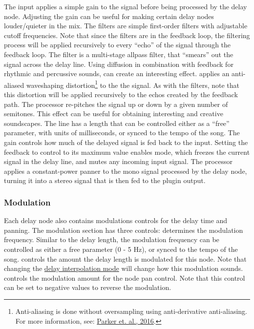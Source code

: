 \documentclass[landscape,twocolumn,a5paper]{manual}
\begin{document}
%
The input  applies a simple gain
to the signal before being processed by the delay
node. Adjusting the gain can be useful for making
certain delay nodes louder/quieter in the mix.
\newline
The  filters are simple
first-order filters with adjustable cutoff frequencies.
Note that since the filters are in the feedback loop,
the filtering process will be applied recursively to every
``echo'' of the signal through the feedback loop.
\newpar
The  filter is a multi-stage allpass
filter, that ``smears'' out the signal across the delay line.
Using diffusion in combination with feedback for rhythmic
and percussive sounds, can create an interesting effect.
\newpar
{} applies an anti-aliased waveshaping
distortion\footnote{Anti-aliasing is done without oversampling using anti-derivative anti-aliasing. For more information, see: \href{http://dafx16.vutbr.cz/dafxpapers/20-DAFx-16_paper_41-PN.pdf}{Parker et. al., 2016}.}
to the the signal. As with the filters, note that this
distortion will be applied recursively to the echos created
by the feedback path.
\newpar
The  processor re-pitches the signal up
or down by a given number of semitones. This effect can be
useful for obtaining interesting and creative soundscapes.
\newline
The  line has a length that can be
controlled either as a ``free'' parameter, with units
of milliseconds, or synced to the tempo of the song.
\newpar
The  gain controls how much of the
delayed signal is fed back to the input.
Setting the feedback to control to its maximum value
enables  mode, which freezes the
current signal in the delay line, and mutes any incoming
input signal.
\newpar
The  processor applies a constant-power
panner to the mono signal processed by the delay node,
turning it into a stereo signal that is then fed to the
plugin output.

\subsubsection{Modulation}
Each delay node also contains modulations controls for the
delay time and panning. The modulation section has three
controls:
\newpar
{} determines the modulation frequency.
Similar to the delay length, the modulation frequency can
be controlled as either a free parameter (0 - 5 Hz), or
synced to the tempo of the song.
\newpar
{} controls the amount the delay length
is modulated for this node. Note that changing the
\hyperlink{goto:interp-mode}{delay interpolation mode}
will change how this modulation sounds.
\newpar
{} controls the modulation amount for
the node pan control. Note that this control can be
set to negative values to reverse the modulation.
\end{document}
